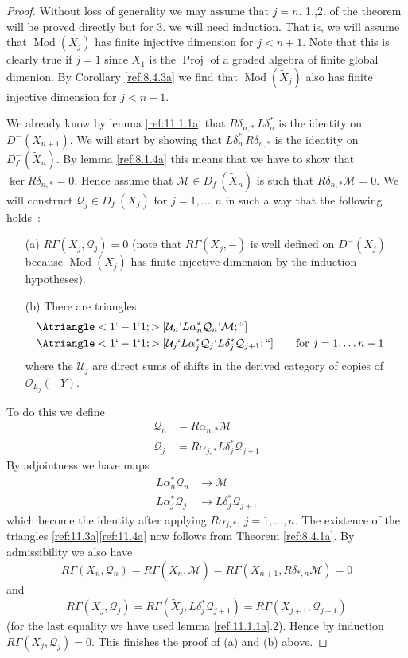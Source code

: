 \documentclass{amsproc}
\def\Mscr{{\mathcal M}}
\def\Oscr{{\mathcal O}}
\def\Qscr{{\mathcal Q}}
\def\Uscr{{\mathcal U}}
\def\ker{\operatorname {ker}}
\def\Proj{\operatorname {Proj}}
\def\Qch{\operatorname {Mod}}
\def\r{\rightarrow}
\let\oldtext\text
\def\text#1{\oldtext{\upshape #1}}
\theoremstyle{definition}
\theoremstyle{remark}
\numberwithin{equation}{section}
\numberwithin{table}{section}
\numberwithin{figure}{section}
\begin{document}
\begin{proof}  Without loss of generality we may  assume that ${j}=n$.
  1.,2. of the theorem will be proved
  directly but for 3. we will need induction. That is, we will assume
  that  $\Qch(X_{j})$ has finite injective dimension for
  ${j}<n+1$. Note that this is clearly true if ${j}=1$ since $X_1$ is the
  $\Proj$ of a graded algebra of finite global dimenion. By Corollary
\eqref{ref:8.4.3a} we find that  $\Qch(\tilde{X}_{j})$ also has
finite injective dimension for ${j}<n+1$.

 We
  already know by lemma \ref{ref:11.1.1a} that $R\delta_{n,\ast}\,
  L\delta^\ast_n$ is the identity on $D^{-}(X_{n+1})$. We will start
  by showing that  $L\delta^\ast_n\, R\delta_{n,\ast}$ is the identity
  on $D^{-}_f(\tilde{X}_{n})$. By lemma \ref{ref:8.1.4a} this means that we
  have to show that $\ker R\delta_{n,\ast}=0$. Hence assume that
  $\Mscr\in D^-_f(\tilde{X}_n)$ is such that
  $R\delta_{n,\ast}\Mscr=0$. We will construct
  $\Qscr_{j}\in D^-_f(X_{j})$ for ${j}=1,\ldots, n$ in such a way that the
  following holds~:
\begin{itemize}
\item[(a)]
$R\Gamma(X_{j},\Qscr_{j})=0$ (note that $R\Gamma(X_{j},-)$ is well defined
on $D^-(X_{j})$ because 
$\Qch(X_{j})$ has finite injective dimension by the induction hypotheses).
\item[(b)]
There are triangles
\begin{align}
\label{ref:11.3a}
&\Atriangle<1`-1`1;>[\Uscr_{n}`L\alpha^\ast_{n}\Qscr_n`\Mscr;``]&\\
\label{ref:11.4a}
&\Atriangle<1`-1`1;>[\Uscr_{{j}}`L\alpha^\ast_{{j}}\Qscr_{j}`L\delta^\ast_{j}\Qscr_{{j}+1};``]
\qquad \text{for ${j}=1,\ldots n-1$}
\end{align}
where the $\Uscr_{j}$ are direct sums of shifts in the derived category
of copies of $\Oscr_{L_{j}}(-Y)$.
\end{itemize}
To do this we define
\begin{align*}
\Qscr_n&=R\alpha_{n,\ast}\Mscr\\
\Qscr_{j}&=R\alpha_{{j},\ast}L\delta^\ast_{{j}} \Qscr_{{j}+1}
\end{align*}
By adjointness we have maps
\begin{align*}
L\alpha^\ast_n\Qscr_n&\r \Mscr\\
L\alpha^\ast_{j} \Qscr_{j}&\r L\delta^\ast_{{j}} \Qscr_{{j}+1}
\end{align*}
which become the identity after applying $R\alpha_{{j},\ast}$,
${j}=1,\ldots,n$. The existence of the triangles
\eqref{ref:11.3a}\eqref{ref:11.4a} now follows from Theorem
\ref{ref:8.4.1a}. 
By admissibility we also have
\[
R\Gamma(X_n,\Qscr_n)=R\Gamma(\tilde{X}_n,\Mscr)=R\Gamma(X_{n+1},
R\delta_{\ast,n}\Mscr )=0
\]
and
\[
R\Gamma(X_{j},\Qscr_{j})=R\Gamma(\tilde{X}_{j}, L\delta^\ast_{{j}}
\Qscr_{{j}+1})=
R\Gamma(X_{{j}+1},\Qscr_{{j}+1})
\]
(for the last equality we have used lemma \ref{ref:11.1.1a}.2).
Hence by induction $R\Gamma(X_{j},\Qscr_{j})=0$. This finishes the proof
of (a) and (b) above.


\end{proof}
\end{document}
